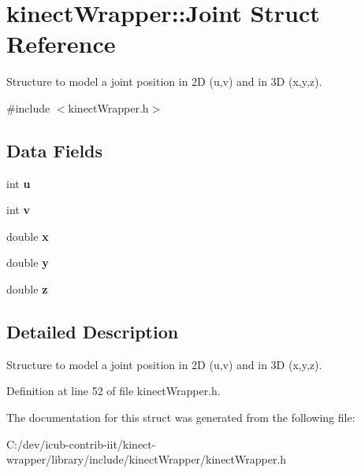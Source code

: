 \section{kinect\+Wrapper\+:\+:Joint Struct Reference}
\label{structkinectWrapper_1_1Joint}


Structure to model a joint position in 2D (u,v) and in 3D (x,y,z).  




{\ttfamily \#include $<$kinect\+Wrapper.\+h$>$}

\subsection*{Data Fields}
\begin{DoxyCompactItemize}
\item 
int {\bfseries u}\label{structkinectWrapper_1_1Joint_a8ed49e3df7ad96e08302a55f0254e6dc}

\item 
int {\bfseries v}\label{structkinectWrapper_1_1Joint_a3abbe494241126336a73e2c5cce4e455}

\item 
double {\bfseries x}\label{structkinectWrapper_1_1Joint_a427ceeb404a1a46e5d7e98566505ad29}

\item 
double {\bfseries y}\label{structkinectWrapper_1_1Joint_a45a9ab5ca36f6e39bcb0d8cd01249fef}

\item 
double {\bfseries z}\label{structkinectWrapper_1_1Joint_aff60e74868c4241a592ae7eb05ab5176}

\end{DoxyCompactItemize}


\subsection{Detailed Description}
Structure to model a joint position in 2D (u,v) and in 3D (x,y,z). 

Definition at line 52 of file kinect\+Wrapper.\+h.



The documentation for this struct was generated from the following file\+:\begin{DoxyCompactItemize}
\item 
C\+:/dev/icub-\/contrib-\/iit/kinect-\/wrapper/library/include/kinect\+Wrapper/kinect\+Wrapper.\+h\end{DoxyCompactItemize}
